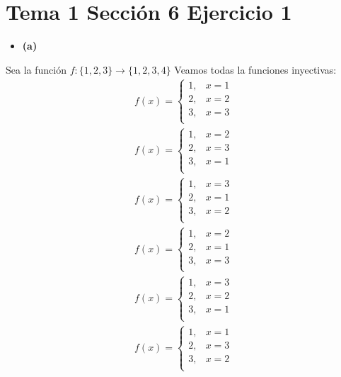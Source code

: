\documentclass{article}
\begin{document}
\section{Tema 1 Sección 6 Ejercicio 1}
\begin{itemize}
\item \bf (a) \rm
\end{itemize}
Sea la función $f:\{1,2,3\}\rightarrow \{1,2,3,4\}$
Veamos todas la funciones inyectivas:
\begin{eqnarray}
f(x)=\begin{cases}
1,& x=1\nonumber\\
2,& x=2\nonumber\\
3,& x=3\nonumber\\
\end{cases}
\end{eqnarray}
\begin{eqnarray}
f(x)=\begin{cases}
1,& x=2\nonumber\\
2,& x=3\nonumber\\
3,& x=1\nonumber\\
\end{cases}
\end{eqnarray}
\begin{eqnarray}
f(x)=\begin{cases}
1,& x=3\nonumber\\
2,& x=1\nonumber\\
3,& x=2\nonumber\\
\end{cases}
\end{eqnarray}
\begin{eqnarray}
f(x)=\begin{cases}
1,& x=2\nonumber\\
2,& x=1\nonumber\\
3,& x=3\nonumber\\
\end{cases}
\end{eqnarray}
\begin{eqnarray}
f(x)=\begin{cases}
1,& x=3\nonumber\\
2,& x=2\nonumber\\
3,& x=1\nonumber\\
\end{cases}
\end{eqnarray}
\begin{eqnarray}
f(x)=\begin{cases}
1,& x=1\nonumber\\
2,& x=3\nonumber\\
3,& x=2\nonumber\\
\end{cases}
\end{eqnarray}
\end{document}
